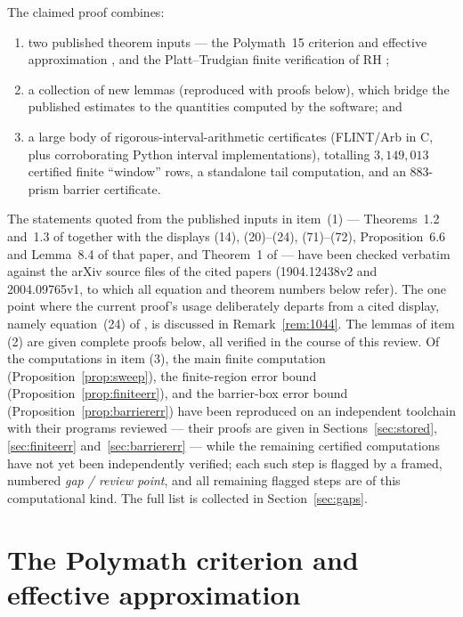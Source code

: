\documentclass[11pt]{article}
\theoremstyle{definition}
\begin{document}
The claimed proof combines:
\begin{enumerate}
\item two published theorem inputs --- the Polymath~15 criterion and
effective approximation \cite{Polymath}, and the Platt--Trudgian finite
verification of RH \cite{PlattTrudgian};
\item a collection of new lemmas (reproduced with proofs below),
which bridge the published estimates to the quantities computed by
the software; and
\item a large body of rigorous-interval-arithmetic certificates
(FLINT/Arb in C, plus corroborating Python interval implementations),
totalling $3{,}149{,}013$ certified finite ``window'' rows, a
standalone tail computation, and an $883$-prism barrier certificate.
\end{enumerate}
The statements quoted from the published inputs in item~(1) ---
Theorems~1.2 and~1.3 of \cite{Polymath} together with the displays
(14), (20)--(24), (71)--(72), Proposition~6.6 and Lemma~8.4 of that
paper, and Theorem~1 of \cite{PlattTrudgian} --- have been checked
verbatim against the arXiv source files of the cited papers
(1904.12438v2 and 2004.09765v1, to which all equation and theorem
numbers below refer). The one point where the current proof's usage
deliberately departs from a cited display, namely equation~(24) of
\cite{Polymath}, is discussed in Remark~\ref{rem:1044}. The
lemmas of item (2) are given complete proofs below, all verified in
the course of this review. Of the computations in item (3), the
main finite computation (Proposition~\ref{prop:sweep}), the
finite-region error bound (Proposition~\ref{prop:finiteerr}), and
the barrier-box error bound (Proposition~\ref{prop:barriererr})
have been reproduced on an independent toolchain with their
programs reviewed --- their proofs are given in
Sections~\ref{sec:stored}, \ref{sec:finiteerr}
and~\ref{sec:barriererr} --- while the
remaining certified computations have not yet been independently
verified; each such step is flagged by a framed, numbered
\emph{gap / review point}, and all remaining flagged steps are of
this computational kind. The full list is collected in
Section~\ref{sec:gaps}.

\section{The Polymath criterion and effective approximation}
\end{document}
